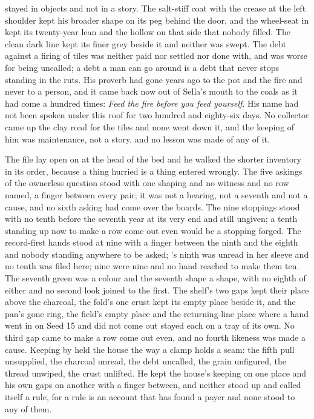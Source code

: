  stayed in objects and not in a story. The salt-stiff coat with the crease at the left shoulder kept his broader shape on its peg behind the door, and the wheel-seat in  kept its twenty-year lean and the hollow on that side that nobody filled. The clean dark line kept its finer grey beside it and neither was swept. The debt against a firing of tiles was neither paid nor settled nor done with, and was worse for being uncalled; a debt a man can go around is a debt that never stops standing in the ruts. His proverb had gone years ago to the pot and the fire and never to a person, and it came back now out of Sella's mouth to the coals as it had come a hundred times: \emph{Feed the fire before you feed yourself}. His name had not been spoken under this roof for two hundred and eighty-six days. No collector came up the clay road for the tiles and none went down it, and the keeping of him was maintenance, not a story, and no lesson was made of any of it.

The file lay open on  at the head of the bed and he walked the shorter inventory in its order, because a thing hurried is a thing entered wrongly. The five askings of the ownerless question stood with one shaping and no witness and no row named, a finger between every pair; it was not a hearing, not a seventh and not a cause, and no sixth asking had come over the boards. The nine stoppings stood with no tenth before the seventh year at its very end and still ungiven; a tenth standing up now to make a row come out even would be a stopping forged. The record-first hands stood at nine with a finger between the ninth and the eighth and nobody standing anywhere to be asked; 's ninth was unread in her sleeve and no tenth was filed here; nine were nine and no hand reached to make them ten. The seventh green was a colour and the seventh shape a shape, with no eighth of either and no second look joined to the first. The shelf's two gaps kept their place above the charcoal, the fold's one crust kept its empty place beside it, and the pan's gone ring, the field's empty place and the returning-line place where a hand went in on Seed 15 and did not come out stayed each on a tray of its own. No third gap came to make a row come out even, and no fourth likeness was made a cause. Keeping by  held the house the way a clamp holds a seam: the fifth pull unsupplied, the charcoal unread, the debt uncalled, the grain unfigured, the thread unwiped, the crust unlifted. He kept the house's keeping on one place and his own gaps on another with a finger between, and neither stood up and called itself a rule, for a rule is an account that has found a payer and none stood to any of them.

